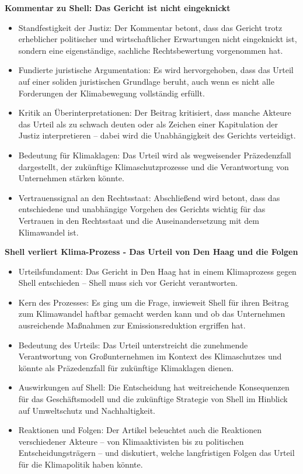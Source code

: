 \documentclass[a4paper, 12pt]{article} %
\begin{document}
 \textbf{\cite{deutschlandfunk.deKommentarShellGericht2024} Kommentar zu Shell: Das Gericht ist nicht eingeknickt}

 \begin{itemize}
    \item Standfestigkeit der Justiz: Der Kommentar betont, dass das Gericht trotz erheblicher politischer und wirtschaftlicher Erwartungen nicht \glqq{}eingeknickt\grqq{} ist, sondern eine eigenständige, sachliche Rechtsbewertung vorgenommen hat.
    \item Fundierte juristische Argumentation: Es wird hervorgehoben, dass das Urteil auf einer soliden juristischen Grundlage beruht, auch wenn es nicht alle Forderungen der Klimabewegung vollständig erfüllt.
    \item Kritik an Überinterpretationen: Der Beitrag kritisiert, dass manche Akteure das Urteil als zu schwach deuten oder als Zeichen einer Kapitulation der Justiz interpretieren – dabei wird die Unabhängigkeit des Gerichts verteidigt.
    \item Bedeutung für Klimaklagen: Das Urteil wird als wegweisender Präzedenzfall dargestellt, der zukünftige Klimaschutzprozesse und die Verantwortung von Unternehmen stärken könnte.
    \item Vertrauenssignal an den Rechtsstaat: Abschließend wird betont, dass das entschiedene und unabhängige Vorgehen des Gerichts wichtig für das Vertrauen in den Rechtsstaat und die Auseinandersetzung mit dem Klimawandel ist.
 \end{itemize}

 \textbf{\cite{deutschlandfunk.deShellVerliertKlimaProzess2021} Shell verliert Klima-Prozess - Das Urteil von Den Haag und die Folgen}

 \begin{itemize}
    \item Urteilsfundament: Das Gericht in Den Haag hat in einem Klimaprozess gegen Shell entschieden – Shell muss sich vor Gericht verantworten.
    \item Kern des Prozesses: Es ging um die Frage, inwieweit Shell für ihren Beitrag zum Klimawandel haftbar gemacht werden kann und ob das Unternehmen ausreichende Maßnahmen zur Emissionsreduktion ergriffen hat.
    \item Bedeutung des Urteils: Das Urteil unterstreicht die zunehmende Verantwortung von Großunternehmen im Kontext des Klimaschutzes und könnte als Präzedenzfall für zukünftige Klimaklagen dienen.
    \item Auswirkungen auf Shell: Die Entscheidung hat weitreichende Konsequenzen für das Geschäftsmodell und die zukünftige Strategie von Shell im Hinblick auf Umweltschutz und Nachhaltigkeit.
    \item Reaktionen und Folgen: Der Artikel beleuchtet auch die Reaktionen verschiedener Akteure – von Klimaaktivisten bis zu politischen Entscheidungsträgern – und diskutiert, welche langfristigen Folgen das Urteil für die Klimapolitik haben könnte.
 \end{itemize}
\end{document}
